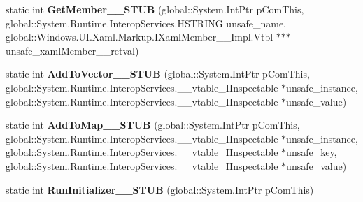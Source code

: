 \begin{DoxyCompactItemize}
static int {\bfseries Get\+Member\+\_\+\+\_\+\+S\+T\+UB} (global\+::\+System.\+Int\+Ptr p\+Com\+This, global\+::\+System.\+Runtime.\+Interop\+Services.\+H\+S\+T\+R\+I\+NG unsafe\+\_\+name, global\+::\+Windows.\+U\+I.\+Xaml.\+Markup.\+I\+Xaml\+Member\+\_\+\+\_\+\+Impl.\+Vtbl $\ast$$\ast$$\ast$unsafe\+\_\+xaml\+Member\+\_\+\+\_\+retval)
\item 
\mbox{\label{struct_windows_1_1_u_i_1_1_xaml_1_1_markup_1_1_i_xaml_type_____impl_1_1_vtbl_a94986475172034a779e4370b06a2bb95}} 
static int {\bfseries Add\+To\+Vector\+\_\+\+\_\+\+S\+T\+UB} (global\+::\+System.\+Int\+Ptr p\+Com\+This, global\+::\+System.\+Runtime.\+Interop\+Services.\+\_\+\+\_\+vtable\+\_\+\+I\+Inspectable $\ast$unsafe\+\_\+instance, global\+::\+System.\+Runtime.\+Interop\+Services.\+\_\+\+\_\+vtable\+\_\+\+I\+Inspectable $\ast$unsafe\+\_\+value)
\item 
\mbox{\label{struct_windows_1_1_u_i_1_1_xaml_1_1_markup_1_1_i_xaml_type_____impl_1_1_vtbl_a826597123ea75e675685fcdc220b845d}} 
static int {\bfseries Add\+To\+Map\+\_\+\+\_\+\+S\+T\+UB} (global\+::\+System.\+Int\+Ptr p\+Com\+This, global\+::\+System.\+Runtime.\+Interop\+Services.\+\_\+\+\_\+vtable\+\_\+\+I\+Inspectable $\ast$unsafe\+\_\+instance, global\+::\+System.\+Runtime.\+Interop\+Services.\+\_\+\+\_\+vtable\+\_\+\+I\+Inspectable $\ast$unsafe\+\_\+key, global\+::\+System.\+Runtime.\+Interop\+Services.\+\_\+\+\_\+vtable\+\_\+\+I\+Inspectable $\ast$unsafe\+\_\+value)
\item 
\mbox{\label{struct_windows_1_1_u_i_1_1_xaml_1_1_markup_1_1_i_xaml_type_____impl_1_1_vtbl_ad5c8dc426912e9b86124c65fc89447ce}} 
static int {\bfseries Run\+Initializer\+\_\+\+\_\+\+S\+T\+UB} (global\+::\+System.\+Int\+Ptr p\+Com\+This)
\end{DoxyCompactItemize}
